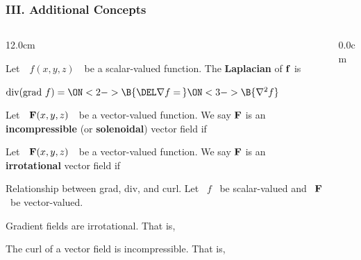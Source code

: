 \begin{frame}
\frametitle{III.  Additional Concepts}
\scriptsize
\begin{columns}
\begin{column}{12.0cm}

\DEF Let \,\, $f(x,y,z)$ \,\, be a scalar-valued function.  The {\bf Laplacian} of ${\bf f}$ is 
\begin{center}
	$\text{div(grad $f$)} = 
	\ON<2->{\B{\DEL \nabla f = \,}}
	\ON<3->{\B{\nabla^2 f}}$
\end{center}

\DEF Let \,\, ${\bf F}(x,y,z)$ \,\, be a vector-valued function.  We say ${\bf F}$ is an {\bf incompressible} (or {\bf solenoidal}) vector field if
\begin{center}
\end{center}

\DEF Let \,\, ${\bf F}(x,y,z)$ \,\, be a vector-valued function.  We say ${\bf F}$ is an {\bf irrotational} vector field if
\begin{center}
\end{center}

\vspace{0.8cm}

\THM Relationship between grad, div, and curl.  Let \, $f$ \, be scalar-valued and \, ${\bf F}$ \, be vector-valued.

\vspace{0.2cm}

\OBUL Gradient fields are irrotational.  That is,
\begin{center}
\end{center}

\OBUL The curl of a vector field is incompressible.  That is,
\begin{center}
\end{center}

\end{column}
\begin{column}{0.0cm}\end{column}
\end{columns}
\end{frame}

